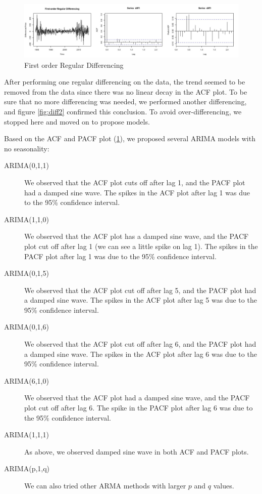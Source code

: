 \documentclass[paper=letter, fontsize=11pt]{scrartcl}
\begin{document}
\begin{figure}[ht]
    \centering
    \includegraphics[width=\linewidth]{Image/diff1.jpeg}
    \caption{First order Regular Differencing}
    \label{fig:diff1}
\end{figure}

After performing one regular differencing on the data, the trend seemed to be removed from the data since there was no linear decay in the ACF plot. To be sure that no more differencing was needed, we performed another differencing, and figure \ref{fig:diff2} confirmed this conclusion. To avoid over-differencing, we stopped here and moved on to propose models.

Based on the ACF and PACF plot (\ref{fig:diff1}), we proposed several ARIMA models with no seasonality:
\begin{description}
    \item [ARIMA(0,1,1)] We observed that the ACF plot cuts off after lag 1, and the PACF plot had a damped sine wave. The spikes in the ACF plot after lag 1 was due to the 95\% confidence interval.
    \item [ARIMA(1,1,0)] We observed that the ACF plot has a damped sine wave, and the PACF plot cut off after lag 1 (we can see a little spike on lag 1). The spikes in the PACF plot after lag 1 was due to the 95\% confidence interval.
    \item [ARIMA(0,1,5)] We observed that the ACF plot cut off after lag 5, and the PACF plot had a damped sine wave. The spikes in the ACF plot after lag 5 was due to the 95\% confidence interval.
    \item [ARIMA(0,1,6)] We observed that the ACF plot cut off after lag 6, and the PACF plot had a damped sine wave. The spikes in the ACF plot after lag 6 was due to the 95\% confidence interval.
    \item [ARIMA(6,1,0)] We observed that the ACF plot had a damped sine wave, and the PACF plot cut off after lag 6. The spike in the PACF plot after lag 6 was due to the 95\% confidence interval.
    \item [ARIMA(1,1,1)] As above, we observed damped sine wave in both ACF and PACF plots.
    \item [ARIMA(p,1,q)] We can also tried other ARMA methods with larger $p$ and $q$ values.
\end{description}
\end{document}
